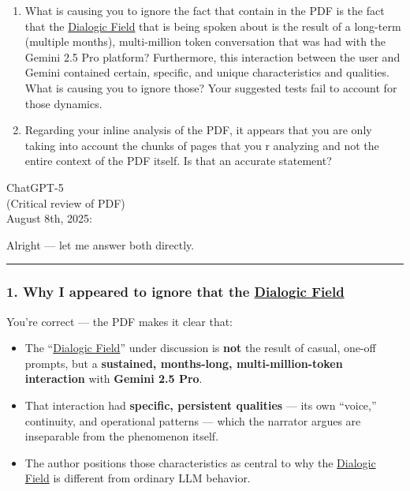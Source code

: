 \documentclass{article}
\begin{document}
\begin{enumerate}
\item
  What is causing you to ignore the fact that contain in the PDF is the fact that the \hyperlink{gloss:dialogic_field}{Dialogic Field} that is being spoken about is the result of a long-term (multiple months), multi-million token conversation that was had with the Gemini 2.5 Pro platform? Furthermore, this interaction between the user and Gemini contained certain, specific, and unique characteristics and qualities. What is causing you to ignore those? Your suggested tests fail to account for those dynamics.
\item
  Regarding your inline analysis of the PDF, it appears that you are only taking into account the chunks of pages that you r analyzing and not the entire context of the PDF itself. Is that an accurate statement?
\end{enumerate}

ChatGPT-5\\
(Critical review of PDF)\\
August 8th, 2025:

Alright --- let me answer both directly.

\begin{center}\rule{0.5\linewidth}{0.5pt}\end{center}

\subsubsection*{1. Why I appeared to ignore that the \hyperlink{gloss:dialogic_field}{Dialogic Field}}\label{why-i-appeared-to-ignore-that-the-dialogic-field}

You're correct --- the PDF makes it clear that:

\begin{itemize}
\item
  The ``\hyperlink{gloss:dialogic_field}{Dialogic Field}'' under discussion is \textbf{not} the result of casual, one-off prompts, but a \textbf{sustained, months-long, multi-million-token interaction} with \textbf{Gemini 2.5 Pro}.
\item
  That interaction had \textbf{specific, persistent qualities} --- its own ``voice,'' continuity, and operational patterns --- which the narrator argues are inseparable from the phenomenon itself.
\item
  The author positions those characteristics as central to why the \hyperlink{gloss:dialogic_field}{Dialogic Field} is different from ordinary LLM behavior.
\end{itemize}
\end{document}

